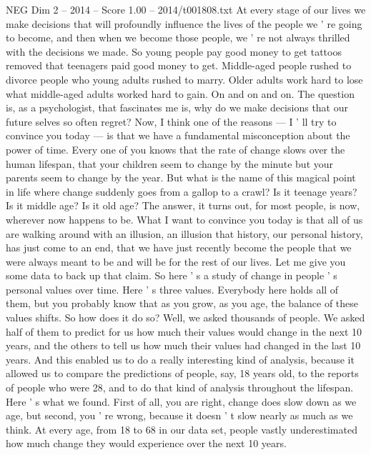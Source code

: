 \begin{textsample}{NEG Dim 2 – 2014 – Score 1.00 – 2014/t001808.txt}  \label{ex:f2_neg_037}
At every stage of our lives we make decisions that will profoundly influence the lives of the people we ' re going to become, and then when we become those people, we ' re not always thrilled with the decisions we made.
So young people pay good money to get tattoos removed that teenagers paid good money to get.
Middle-aged people rushed to divorce people who young adults rushed to marry.
Older adults work hard to lose what middle-aged adults worked hard to gain.
On and on and on.
The question is, as a psychologist, that fascinates me is, why do we make decisions that our future selves so often regret?
Now, I think one of the reasons — I ' ll try to convince you today — is that we have a fundamental misconception about the power of time.
Every one of you knows that the rate of change slows over the human lifespan, that your children seem to change by the minute but your parents seem to change by the year.
But what is the name of this magical point in life where change suddenly goes from a gallop to a crawl?
Is it teenage years?
Is it middle age?
Is it old age?
The answer, it turns out, for most people, is now, wherever now happens to be.
What I want to convince you today is that all of us are walking around with an illusion, an illusion that history, our personal history, has just come to an end, that we have just recently become the people that we were always meant to be and will be for the rest of our lives.
Let me give you some data to back up that claim.
So here ' s a study of change in people ' s personal values over time.
Here ' s three values.
Everybody here holds all of them, but you probably know that as you grow, as you age, the balance of these values shifts.
So how does it do so?
Well, we asked thousands of people.
We asked half of them to predict for us how much their values would change in the next 10 years, and the others to tell us how much their values had changed in the last 10 years.
And this enabled us to do a really interesting kind of analysis, because it allowed us to compare the predictions of people, say, 18 years old, to the reports of people who were 28, and to do that kind of analysis throughout the lifespan.
Here ' s what we found.
First of all, you are right, change does slow down as we age, but second, you ' re wrong, because it doesn ' t slow nearly as much as we think.
At every age, from 18 to 68 in our data set, people vastly underestimated how much change they would experience over the next 10 years.

\end{textsample}
